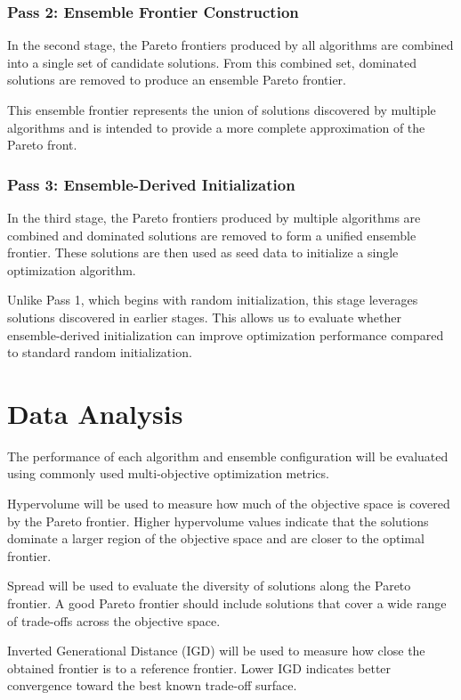 \documentclass[sigconf,authorversion,nonacm]{acmart}
\begin{document}
\subsubsection{Pass 2: Ensemble Frontier Construction}

In the second stage, the Pareto frontiers produced by all algorithms 
are combined into a single set of candidate solutions. From this combined 
set, dominated solutions are removed to produce an ensemble Pareto frontier.

This ensemble frontier represents the union of solutions discovered 
by multiple algorithms and is intended to provide a more complete 
approximation of the Pareto front.

\subsubsection{Pass 3: Ensemble-Derived Initialization}

In the third stage, the Pareto frontiers produced by multiple algorithms 
are combined and dominated solutions are removed to form a unified 
ensemble frontier. These solutions are then used as seed data to 
initialize a single optimization algorithm.

Unlike Pass 1, which begins with random initialization, this stage 
leverages solutions discovered in earlier stages. This allows us to 
evaluate whether ensemble-derived initialization can improve 
optimization performance compared to standard random initialization.

\section{Data Analysis}

The performance of each algorithm and ensemble configuration will be 
evaluated using commonly used multi-objective optimization metrics.

Hypervolume will be used to measure how much of the objective space is 
covered by the Pareto frontier. Higher hypervolume values indicate that 
the solutions dominate a larger region of the objective space and are 
closer to the optimal frontier.

Spread will be used to evaluate the diversity of solutions along the 
Pareto frontier. A good Pareto frontier should include solutions that 
cover a wide range of trade-offs across the objective space.

Inverted Generational Distance (IGD) will be used to measure how close 
the obtained frontier is to a reference frontier. Lower IGD indicates 
better convergence toward the best known trade-off surface.
\end{document}
